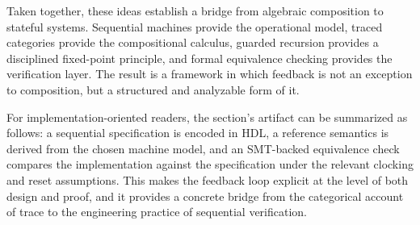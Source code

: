 Taken together, these ideas establish a bridge from algebraic composition to stateful systems. Sequential machines provide the operational model, traced categories provide the compositional calculus, guarded recursion provides a disciplined fixed-point principle, and formal equivalence checking provides the verification layer. The result is a framework in which feedback is not an exception to composition, but a structured and analyzable form of it.

For implementation-oriented readers, the section's artifact can be summarized as follows: a sequential specification is encoded in HDL, a reference semantics is derived from the chosen machine model, and an SMT-backed equivalence check compares the implementation against the specification under the relevant clocking and reset assumptions. This makes the feedback loop explicit at the level of both design and proof, and it provides a concrete bridge from the categorical account of trace to the engineering practice of sequential verification.
